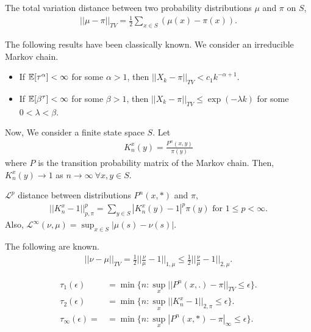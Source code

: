 \documentclass[all-lectures.tex]{subfiles}
\begin{document}
\begin{defn}
The total variation distance between two probability distributions $\mu$ and $\pi$ on $S$, 
\begin{align*}
||\mu - \pi||_{TV} = \frac{1}{2} \sum_{x\in S} (\mu(x) - \pi(x)).
\end{align*}
\end{defn}
The following results have been classically known.  We consider an irreducible Markov chain.
\begin{itemize}
\item If $\mathbb{E}[\tau^\alpha] < \infty$ for some $\alpha > 1$, then $|| X_k - \pi ||_{TV} < c_1 k^{-\alpha +1}$.
\item If $\mathbb{E}[\beta^{\tau}] < \infty$ for some $\beta > 1$, then $|| X_k - \pi||_{TV} \leq \exp(-\lambda k)$ for some $0 < \lambda < \beta$.
\end{itemize}
Now, We consider a finite state space $S$. Let 
\begin{align*}
K_n^{x}(y) = \frac{P^n(x,y)}{\pi(y)}
\end{align*}
where $P$ is the transition probability matrix of the Markov chain. Then, $K_n^{x}(y) \rightarrow 1$ as $n \rightarrow \infty \ \forall x,y \in S$. 
\begin{defn}
$\mathcal{L}^p$ distance between distributions $P^n(x,*)$ and $\pi$, 
\begin{align*}
||K^x_n - 1||^p_{p,\pi} = \sum_{y\in S} |K^x_n(y)-1|^p \pi(y) \text{ for } 1 \leq p < \infty.
\end{align*}
Also, $\mathcal{L}^{\infty}(\nu,\mu) = \sup_{x\in S} |\mu(s) - \nu(s)|$.
\end{defn}

The following are known.
\begin{align}\label{eq:tau_bounds}
||\nu -\mu||_{TV} = \frac{1}{2} ||\frac{\nu}{\mu} -1||_{1,\mu} \leq \frac{1}{2} ||\frac{\nu}{\mu} -1 ||_{2,\mu}.
\end{align}
\begin{defn}
\begin{align*}
\tau_1(\epsilon) &= \min\{n: \sup_x ||P^n(x,.)-\pi||_{TV} \leq \epsilon\}. \\
\tau_2(\epsilon) &= \min\{n: \sup_x ||K_n^x - 1||_{2,\pi} \leq \epsilon\}. \\
\tau_\infty(\epsilon) = &= \min\{n: \sup _x |P^n(x,*) - \pi|_\infty \leq \epsilon\}.
\end{align*}
\end{defn}
\end{document}
